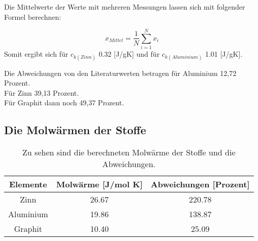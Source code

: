 Die Mittelwerte der Werte mit mehreren Messungen lassen sich mit folgender Formel berechnen:

\begin{equation}
    x_{Mittel}=\frac{1}{N} \sum_{i=1}^N x_i
\end{equation}
Somit ergibt sich für \(c_{k(Zinn)}\) 0.32 [J/gK] und für \(c_{k(Aluminium)}\) 1.01 [J/gK].

Die Abweichungen von den Literaturwerten betragen für Aluminium 12,72 Prozent.\\
Für Zinn 39,13 Prozent.\\
Für Graphit dann noch 49,37 Prozent.

\subsection{Die Molwärmen der Stoffe}

\begin{table}[htp]
    \centering
    \caption{Zu sehen sind die berechneten Molwärme der Stoffe und die Abweichungen.}
    \label{tab:tabMol}
    \begin{tabular}{c c c}
        \toprule
        Elemente & Molwärme [J/mol K]& Abweichungen [Prozent]\\
        \midrule
        Zinn & 26.67 & 220.78 \\
        Aluminium & 19.86 & 138.87\\
        Graphit & 10.40 & 25.09\\
        \bottomrule
    \end{tabular}
\end{table}

